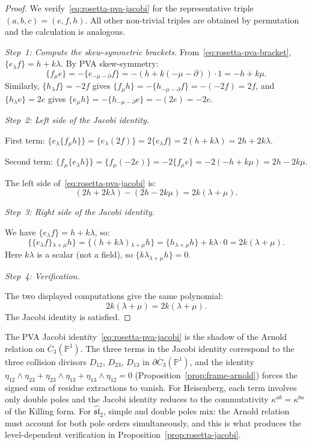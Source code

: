 \begin{proof}
We verify~\eqref{eq:rosetta-pva-jacobi} for the representative
triple $(a, b, c) = (e, f, h)$. All other non-trivial triples
are obtained by permutation and the calculation is analogous.

\medskip
\emph{Step~1: Compute the skew-symmetric brackets.}
From~\eqref{eq:rosetta-pva-bracket},
$\{e {}_\lambda f\} = h + k\lambda$. By PVA skew-symmetry:
\begin{equation}\label{eq:rosetta-skew-fe}
\{f {}_\mu e\}
= -\{e {}_{-\mu - \partial} f\}
= -(h + k(-\mu - \partial)) \cdot 1
= -h + k\mu.
\end{equation}
Similarly, $\{h {}_\lambda f\} = -2f$ gives
$\{f {}_\mu h\} = -\{h {}_{-\mu - \partial} f\}
= -(-2f) = 2f$, and $\{h {}_\lambda e\} = 2e$ gives
$\{e {}_\mu h\} = -\{h {}_{-\mu - \partial} e\} = -(2e) = -2e$.

\medskip
\emph{Step~2: Left side of the Jacobi identity.}

First term:
$\{e {}_\lambda \{f {}_\mu h\}\}
= \{e {}_\lambda (2f)\}
= 2\{e {}_\lambda f\}
= 2(h + k\lambda)
= 2h + 2k\lambda$.

Second term:
$\{f {}_\mu \{e {}_\lambda h\}\}
= \{f {}_\mu (-2e)\}
= -2\{f {}_\mu e\}
= -2(-h + k\mu)
= 2h - 2k\mu$.

The left side of~\eqref{eq:rosetta-pva-jacobi} is:
\[
(2h + 2k\lambda) - (2h - 2k\mu) = 2k(\lambda + \mu).
\]

\medskip
\emph{Step~3: Right side of the Jacobi identity.}

We have $\{e {}_\lambda f\} = h + k\lambda$, so:
\[
\{\{e {}_\lambda f\} {}_{\lambda+\mu} h\}
= \{(h + k\lambda) {}_{\lambda+\mu} h\}
= \{h {}_{\lambda+\mu} h\} + k\lambda \cdot 0
= 2k(\lambda + \mu).
\]
Here $k\lambda$ is a scalar (not a field), so
$\{k\lambda {}_{\lambda+\mu} h\} = 0$.

\medskip
\emph{Step~4: Verification.}

The two displayed computations give the same polynomial:
\[
2k(\lambda + \mu) = 2k(\lambda + \mu).
\]
The Jacobi identity is satisfied.
\end{proof}

\begin{remark}
\label{rem:rosetta-jacobi-geometric}
The PVA Jacobi identity~\eqref{eq:rosetta-pva-jacobi} is the shadow
of the Arnold relation on $\overline{C}_3(\mathbb{P}^1)$. The three
terms in the Jacobi identity correspond to the three collision
divisors $D_{12}$, $D_{23}$, $D_{13}$ in
$\partial\overline{C}_3(\mathbb{P}^1)$, and the identity
$\eta_{12} \wedge \eta_{23} + \eta_{23} \wedge \eta_{13}
+ \eta_{13} \wedge \eta_{12} = 0$
(Proposition~\ref{prop:frame-arnold}) forces the signed sum of
residue extractions to vanish. For Heisenberg, each term involves
only double poles and the Jacobi identity reduces to the
commutativity $\kappa^{ab} = \kappa^{ba}$ of the Killing form. For
$\widehat{\mathfrak{sl}}_2$, simple and double poles mix: the
Arnold relation must account for both pole orders simultaneously,
and this is what produces the level-dependent verification in
Proposition~\ref{prop:rosetta-jacobi}.
\end{remark}

